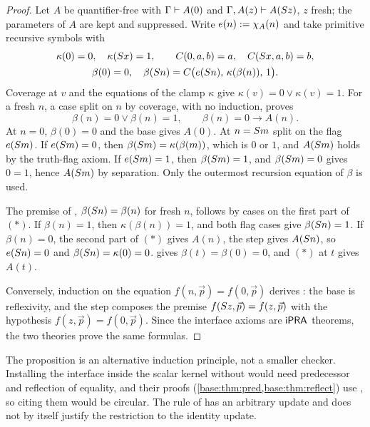 \begin{proof}
Let $A$ be quantifier-free with $\Gamma\vdash A(0)$ and
$\Gamma,A(z)\vdash A(S z)$, $z$ fresh; the parameters of $A$ are kept and
suppressed. Write $e(n)\mathrel{:=}\chi_A(n)$ and take primitive recursive symbols
with
\begin{gather*}
\kappa(0)=0,\quad \kappa(S x)=1,\qquad C(0,a,b)=a,\quad C(S x,a,b)=b,\\
\beta(0)=0,\quad \beta(S n)=C\bigl(e(S n),\,\kappa(\beta(n)),\,1\bigr).
\end{gather*}
Coverage at $v$ and the equations of the clamp $\kappa$ give
$\kappa(v)=0\vee\kappa(v)=1$.
For a fresh $n$, a case split on $n$ by coverage, with no induction, proves
\[
\beta(n)=0\vee\beta(n)=1,\qquad \beta(n)=0\to A(n).
\tag{$*$}
\]
At $n=0$, $\beta(0)=0$ and the base gives $A(0)$. At $n=S m$ split on the
flag $e(S m)$. If $e(S m)=0$, then $\beta(S m)=\kappa(\beta(m))$, which is
$0$ or $1$, and $A(S m)$ holds by the truth-flag axiom. If
$e(S m)=1$, then $\beta(S m)=1$, and $\beta(S m)=0$ gives $0=1$,
hence $A(S m)$ by separation. Only the outermost recursion equation of $\beta$ is used.

The premise of , $\beta(S n)=\beta(n)$ for fresh $n$,
follows by cases on the first part of $(*)$. If $\beta(n)=1$, then
$\kappa(\beta(n))=1$, and
both flag cases give $\beta(S n)=1$. If $\beta(n)=0$, the second part of
$(*)$ gives $A(n)$, the step gives $A(S n)$, so $e(S n)=0$ and
$\beta(S n)=\kappa(0)=0$.  gives $\beta(t)=\beta(0)=0$, and $(*)$
at $t$ gives $A(t)$.

Conversely, induction on the equation $f(n,\vec p)=f(0,\vec p)$ derives
: the base is reflexivity, and the step composes the premise
$f(S z,\vec p)=f(z,\vec p)$ with the hypothesis
$f(z,\vec p)=f(0,\vec p)$. Since the interface axioms are $\mathsf{iPRA}$ theorems, the
two theories prove the same formulas.
\end{proof}

The proposition is an alternative induction principle, not a smaller checker.
Installing the interface inside the scalar kernel without  would
need predecessor and reflection of equality, and their proofs
(\cref{base:thm:pred,base:thm:reflect}) use , so citing them would
be circular. The rule  of  has an
arbitrary update and does not by itself justify the restriction to the
identity update.

